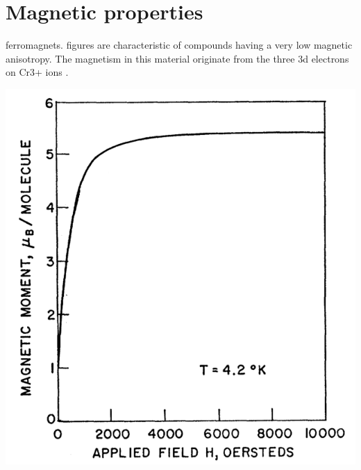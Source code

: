 \documentclass[preprint,pre,floats,aps,amsmath,amssymb]{revtex4}
\begin{document}

\section{Magnetic properties}

ferromagnets. figures are characteristic of compounds having a very low magnetic anisotropy. The magnetism in this material originate from the three 3d electrons on Cr3+ ions \cite{selmi}.

\noindent\begin{minipage}{0.39\linewidth}
\includegraphics[width=1\linewidth]{momvsfield.png}
\centering{}
\end{minipage}%
~ ~
\end{document}
